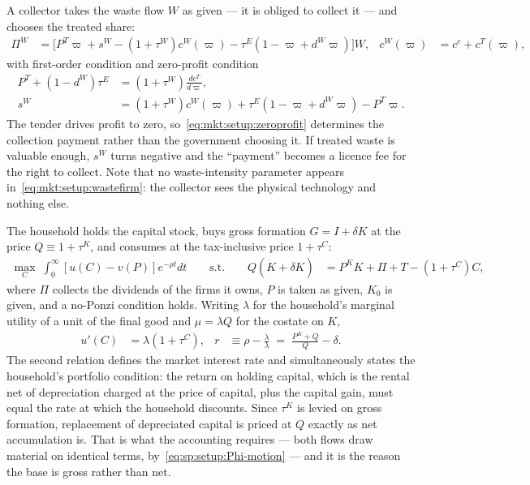  A collector takes the waste flow $W$ as given --- it is
obliged to collect it --- and chooses the treated share:
\begin{align}
\Pi^W &= \Big[P^T\varpi+s^W-\left(1+\tau^W\right)c^W\!\left(\varpi\right)
-\tau^E\left(1-\varpi+d^W\varpi\right)\Big]W,
&
c^W\!\left(\varpi\right)&=c^c+c^T\!\left(\varpi\right),
\label{eq:mkt:setup:wastefirm}
\end{align}
with first-order condition and zero-profit condition
\begin{align}
P^T+\left(1-d^W\right)\tau^E &= \left(1+\tau^W\right)\frac{dc^T}{d\varpi},
\label{eq:mkt:setup:foc:varpi}
\\
s^W &= \left(1+\tau^W\right)c^W\!\left(\varpi\right)
+\tau^E\left(1-\varpi+d^W\varpi\right)-P^T\varpi .
\label{eq:mkt:setup:zeroprofit}
\end{align}
The tender drives profit to zero, so~\eqref{eq:mkt:setup:zeroprofit} determines the collection payment
rather than the government choosing it. If treated waste is valuable enough, $s^W$ turns negative and
the ``payment'' becomes a licence fee for the right to collect. Note that no waste-intensity parameter
appears in~\eqref{eq:mkt:setup:wastefirm}: the collector sees the physical technology and nothing else.

 The household holds the capital stock, buys gross formation $G=I+\delta K$
at the price $Q\equiv1+\tau^K$, and consumes at the tax-inclusive price $1+\tau^C$:
\begin{align}
\max_{C}\;\int_0^\infty\left[u(C)-v(P)\right]e^{-\rho t}dt
\qquad\text{s.t.}\qquad
Q\left(\dot K+\delta K\right) &= P^KK+\Pi+T-\left(1+\tau^C\right)C,
\label{eq:mkt:setup:household}
\end{align}
where $\Pi$ collects the dividends of the firms it owns, $P$ is taken as given, $K_0$ is given, and a
no-Ponzi condition holds. Writing $\lambda$ for the household's marginal utility of a unit of the final
good and $\mu=\lambda Q$ for the costate on $K$,
\begin{align}
u'\!\left(C\right) &= \lambda\left(1+\tau^C\right),
&
r &\equiv \rho-\frac{\dot\lambda}{\lambda} \;=\; \frac{P^K+\dot Q}{Q}-\delta .
\label{eq:mkt:setup:household-euler}
\end{align}
The second relation defines the market interest rate and simultaneously states the household's
portfolio condition: the return on holding capital, which is the rental net of depreciation charged at
the price of capital, plus the capital gain, must equal the rate at which the household discounts.
Since $\tau^K$ is levied on gross formation, replacement of depreciated capital is priced at $Q$
exactly as net accumulation is. That is what the accounting requires --- both flows draw material on
identical terms, by~\eqref{eq:sp:setup:Phi-motion} --- and it is the reason the base is gross rather
than net.

